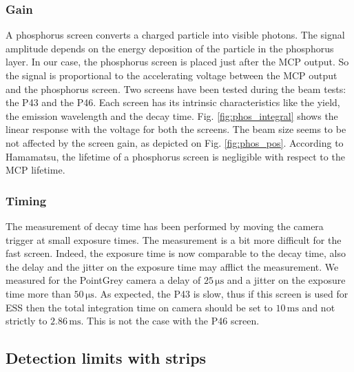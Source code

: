 \begin{refsection}
  \subsubsection{Gain}
  A phosphorus screen converts a charged particle into visible photons.
  The signal amplitude depends on the energy deposition of the particle in the phosphorus layer. In our case, the phosphorus screen is placed just after the MCP output. So the signal is proportional to the accelerating voltage between the MCP output and the phosphorus screen. Two screens have been tested during the beam tests: the P43 and the P46. Each screen has its intrinsic characteristics like the yield, the emission wavelength and the decay time. Fig. \ref{fig:phos_integral} shows the linear response with the voltage for both the screens. The beam size seems to be not affected by the screen gain, as depicted on Fig. \ref{fig:phos_pos}. According to Hamamatsu, the lifetime of a phosphorus screen is negligible with respect to the MCP lifetime.

  
  

  \subsubsection{Timing}
  The measurement of decay time has been performed by moving the camera trigger at small exposure times. The measurement is a bit more difficult for the fast screen. Indeed, the exposure time is now comparable to the decay time, also the delay and the jitter on the exposure time may afflict the measurement.
  We measured for the PointGrey camera a delay of $25\,\mathrm{\mu s}$ and a jitter on the exposure time more than $50\,\mathrm{\mu s}$.
  As expected, the P43 is slow, thus if this screen is used for ESS then the total integration time on camera should be set to $10\,\mathrm{ms}$ and not strictly to $2.86\,\mathrm{ms}$. This is not the case with the P46 screen.
  

  \subsection{Detection limits with strips}


\end{refsection}
